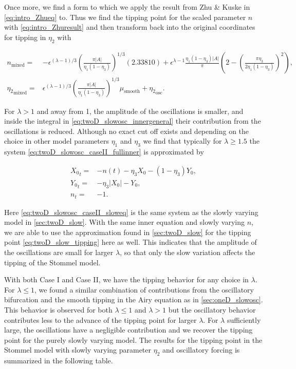 Once more, we find a form to which we apply the result from Zhu \& Kuske in \eqref{eq:intro_Zhueq} to. Thus we find the tipping point for the scaled parameter $n$ with \eqref{eq:intro_Zhuresult} and then transform back into the original coordinates for tipping in $\eta_2$ with

\begin{equation}
\begin{aligned}
n_{\text{mixed}}=&-\epsilon^{(\lambda-1)/3}\left(\frac{\pi|A|}{\eta_1(1-\eta_3)}\right)^{1/3}(2.33810)+\epsilon^{\lambda-1}\frac{\eta_1(1-\eta_3)|A|}{\pi}\left(2-\left(\frac{\pi\eta_3}{2\eta_1(1-\eta_3)}\right)^2\right),\\
{\eta_2}_{\text{mixed}}=& \epsilon^{(\lambda-1)/3}\left(\frac{\pi|A|}{\eta_1(1-\eta_3)}\right)^{1/3}\mu_{\text{smooth}}+{\eta_2}_{\text{osc}}.
\end{aligned}
\end{equation}

For $\lambda>1$ and away from 1, the amplitude of the oscillations is smaller, and inside the integral in \eqref{eq:twoD_slowosc_innergeneral} their contribution from the oscillations is reduced. Although no exact cut off exists and depending on the choice in other model parameters $\eta_1$ and $\eta_3$ we find that typically for $\lambda\ge 1.5$ the system \eqref{eq:twoD_slowosc_caseII_fullinner} is approximated by

\begin{equation}\label{eq:twoD_slowosc_caseII_sloweq}
\begin{aligned}
{X_0}_t =& -n(t)-\eta_3 X_0 -(1-\eta_3)Y_0,\\
{Y_0}_t =&-\eta_3|X_0|-Y_0,\\
n_t =&-1.
\end{aligned}
\end{equation}

Here \eqref{eq:twoD_slowosc_caseII_sloweq} is the same system as the slowly varying model in \autoref{sec:twoD_slow}. With the same inner equation and slowly varying $n$, we are able to use the approximation found in \autoref{sec:twoD_slow} for the tipping point \eqref{eq:twoD_slow_tipping} here as well. This indicates that the amplitude of the oscillations are small for larger $\lambda$, so that only the slow variation affects the tipping of the Stommel model.

With both Case I and Case II, we have the tipping behavior for any choice in $\lambda$. For $\lambda\le1$, we found a similar combination of contributions from the oscillatory bifurcation and the smooth tipping in the Airy equation as in \autoref{sec:oneD_slowosc}. This behavior is observed for both $\lambda\le 1$ and $\lambda>1$ but the oscillatory behavior contributes less to the advance of the tipping point for larger $\lambda$. For $\lambda$ sufficiently large, the oscillations have a negligible contribution and we recover the tipping point for the purely slowly varying model. The results for the tipping point in the Stommel model with slowly varying parameter $\eta_2$ and oscillatory forcing is summarized in the following table.

